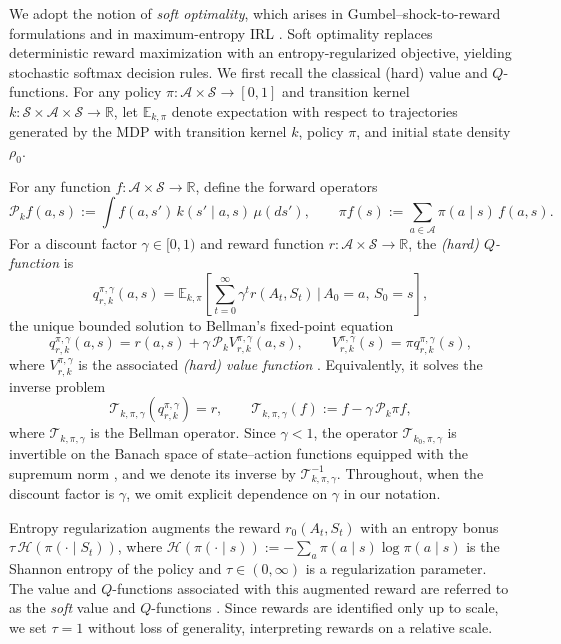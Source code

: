 \documentclass[12pt]{article}
\theoremstyle{plain}
\begin{document}
We adopt the notion of \emph{soft optimality}, which arises in
Gumbel–shock-to-reward formulations \citep{rust1987optimal,hotz1993conditional,aguirregabiria2010dynamic}
and in maximum-entropy IRL \citep{ziebart2008maximum,ziebart2010modeling,haarnoja2017reinforcement}.
Soft optimality replaces deterministic reward maximization with an
entropy-regularized objective, yielding stochastic softmax decision rules. We
first recall the classical (hard)
value and $Q$-functions. For any policy $\pi:\mathcal{A}\times\mathcal{S}\to[0,1]$
and transition kernel $k:\mathcal{S}\times\mathcal{A}\times\mathcal{S}\to\mathbb{R}$,
let $\mathbb{E}_{k,\pi}$ denote expectation with respect to trajectories generated by
the MDP with transition kernel $k$, policy $\pi$, and initial state density $\rho_0$.

For any function $f:\mathcal{A}\times\mathcal{S}\to\mathbb{R}$, define the forward
operators
\[
\mathcal{P}_k f(a,s)
:= \int f(a,s')\,k(s'\mid a,s)\,\mu(ds'),
\qquad 
\pi f(s)
:= \sum_{a\in\mathcal{A}} \pi(a\mid s)\, f(a,s).
\]
For a discount factor $\gamma\in[0,1)$ and reward function
$r:\mathcal{A}\times\mathcal{S}\to\mathbb{R}$, the \emph{(hard) $Q$-function} is
\[
q_{r,k}^{\pi,\gamma}(a,s)
= \mathbb{E}_{k,\pi}\!\left[\sum_{t=0}^\infty \gamma^t r(A_t,S_t)
  \,\Big|\,A_0=a,\, S_0=s\right],
\]
the unique bounded solution to Bellman's fixed-point equation
\begin{equation}
q_{r,k}^{\pi,\gamma}(a,s)
= r(a,s) + \gamma\,\mathcal{P}_k V_{r,k}^{\pi,\gamma}(a,s),
\qquad 
V_{r,k}^{\pi,\gamma}(s) = \pi q_{r,k}^{\pi,\gamma}(s),
\label{eqn::hardQ}
\end{equation}
where $V_{r,k}^{\pi,\gamma}$ is the associated \emph{(hard) value function}
\citep{bellman1954theory}. Equivalently, it solves the inverse problem
\[
\mathcal{T}_{k,\pi,\gamma}(q_{r,k}^{\pi,\gamma}) = r,
\qquad  
\mathcal{T}_{k,\pi,\gamma}(f) := f - \gamma\,\mathcal{P}_k \pi f,
\]
where \(\mathcal{T}_{k,\pi,\gamma}\) is the Bellman operator.  Since \(\gamma < 1\), the operator \(\mathcal{T}_{k_0,\pi,\gamma}\) is invertible
on the Banach space of state–action functions equipped with the supremum norm
\citep{bellman1954theory}, and we denote its inverse by
\(\mathcal{T}_{k,\pi,\gamma}^{-1}\). Throughout, when the
discount factor is $\gamma$, we omit explicit dependence on $\gamma$ in our notation.  

Entropy regularization augments the reward $r_0(A_t,S_t)$ with an entropy bonus
$\tau\,\mathcal{H}(\pi(\cdot\mid S_t))$, where
$\mathcal{H}(\pi(\cdot\mid s)) := -\sum_{a} \pi(a\mid s)\log \pi(a\mid s)$ is the
Shannon entropy of the policy and $\tau \in (0,\infty)$ is a regularization
parameter. The value and $Q$-functions associated with this augmented reward are
referred to as the \emph{soft} value and $Q$-functions \citep{haarnoja2017reinforcement}.
Since rewards are identified only up to scale, we set $\tau=1$ without loss of
generality, interpreting rewards on a relative scale.
\end{document}
